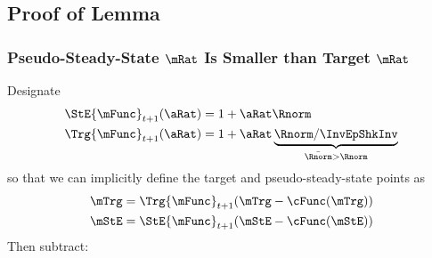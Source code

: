 \documentclass[\econtexRoot/BufferStockTheory]{subfiles}
\begin{document}

\subsection{Proof of Lemma}%

\subsubsection{Pseudo-Steady-State \texorpdfstring{$\mRat$}{m} Is Smaller than Target \texorpdfstring{$\mRat$}{m}}
Designate
\begin{equation}\begin{split}
  \StE{\mFunc}_{t+1}(\aRat) %
   & = 1+\aRat\Rnorm
\\  \Trg{\mFunc}_{t+1}(\aRat)%
 & = 1+\aRat\underbrace{\Rnorm/\InvEpShkInv}_{\bar{\Rnorm} > \Rnorm}
\end{split}\end{equation}
so that we can implicitly define the target and pseudo-steady-state points as
\begin{equation}\begin{split}
  \mTrg & =\Trg{\mFunc}_{t+1}(\mTrg-\cFunc(\mTrg))
  \\ \mStE & = \StE{\mFunc}_{t+1}(\mStE-\cFunc(\mStE))
\end{split}\end{equation}
Then subtract:
\end{document}
